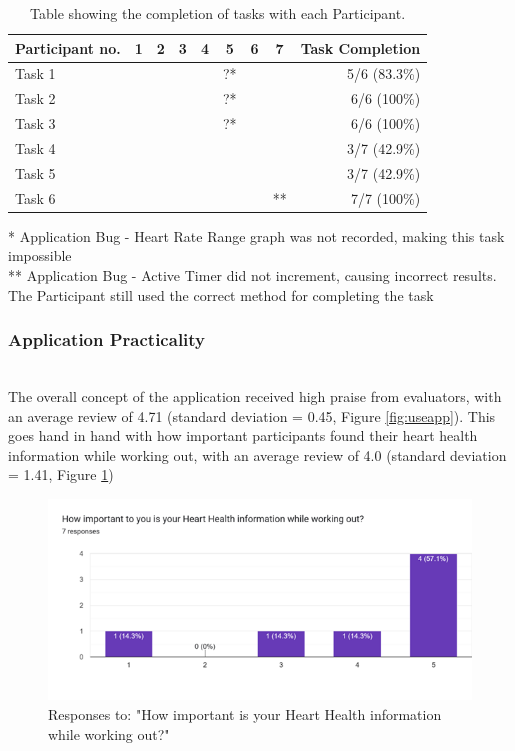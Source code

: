 \documentclass{l4proj}
\newcommand{\cmark}{\ding{51}}
\newcommand{\xmark}{\ding{55}}
\begin{document}
\begin{table}[h!]
    \centering
    \caption{Table showing the completion of tasks with each Participant.} %
    \label{fig:tasktable}
    \begin{tabular}{|l|ccccccc|r|}
        \hline  
        Participant no. & 1 & 2 & 3 & 4 & 5 & 6 & 7 & Task Completion \\
        \hline
        Task 1 & \cmark & \cmark & \cmark & \xmark & ?* & \cmark & \cmark & 5/6 (83.3\%)\\
        Task 2 & \cmark & \cmark & \cmark & \cmark & ?* & \cmark & \cmark & 6/6 (100\%)\\
        Task 3 & \cmark & \cmark & \cmark & \cmark & ?* & \cmark & \xmark & 6/6 (100\%)\\
        Task 4 & \xmark & \cmark & \xmark & \xmark & \cmark & \cmark & \xmark & 3/7 (42.9\%)\\
        Task 5 & \xmark & \cmark & \xmark & \xmark & \cmark & \cmark & \xmark & 3/7 (42.9\%)\\
        Task 6 & \cmark & \cmark & \cmark & \cmark & \cmark & \cmark & \cmark** & 7/7 (100\%)\\
        \hline
    \end{tabular}
\end{table}
* Application Bug - Heart Rate Range graph was not recorded, making this task impossible\\
** Application Bug - Active Timer did not increment, causing incorrect results. The Participant still used the correct method for completing the task

\subsubsection{Application Practicality}
\noindent\mbox{}\\

The overall concept of the application received high praise from evaluators, with an average review of 4.71 (standard deviation = 0.45, Figure \ref{fig:useapp}). This goes hand in hand with how important participants found their heart health information while working out, with an average review of 4.0 (standard deviation = 1.41, Figure \ref{fig:heartimportant})

\begin{figure}[h!]
    \centering
    \includegraphics[width=0.62\linewidth]{dissertation//dissImages/HeartImportant.png}
    \caption{Responses to: "How important is your Heart Health information while working out?"}
    \label{fig:heartimportant}
\end{figure}
\end{document}

